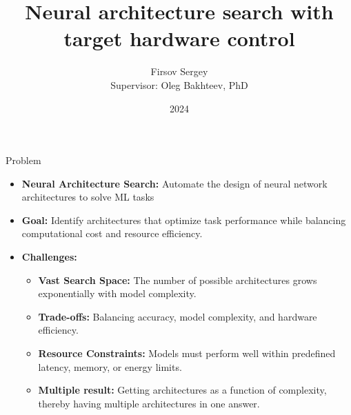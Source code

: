 \documentclass{beamer}
\title{Neural architecture search with target hardware control}
\author{Firsov Sergey \\ Supervisor: Oleg Bakhteev, PhD}
\institute{Moscow Institute of Physics and Technology}
\date{2024}
\begin{document}
\begin{frame}
    \titlepage
\end{frame}

\begin{frame}{Problem}
\begin{itemize}
    \item \textbf{Neural Architecture Search:} 
    Automate the design of neural network architectures to solve ML tasks
    \item \textbf{Goal:} Identify architectures that optimize task performance while balancing computational cost and resource efficiency.
    \item \textbf{Challenges:}
    \begin{itemize}
        \item \textbf{Vast Search Space:} The number of possible architectures grows exponentially with model complexity.
        \item \textbf{Trade-offs:} Balancing accuracy, model complexity, and hardware efficiency.
        \item \textbf{Resource Constraints:} Models must perform well within predefined latency, memory, or energy limits.
        \item \textbf{Multiple result:} Getting architectures as a function of complexity, thereby having multiple architectures in one answer.
    \end{itemize}
    
\end{itemize}
\end{frame}
\end{document}
